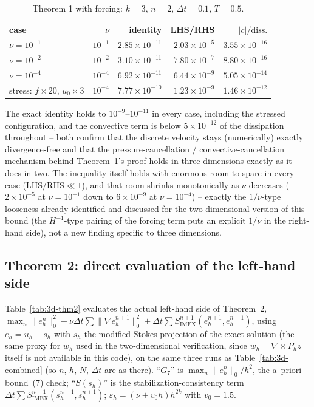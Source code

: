 \documentclass[11pt]{article}
\newcommand{\eps}{\varepsilon}
\begin{document}
\begin{table}[h]\centering
\caption{Theorem 1 with forcing: $k=3$, $n=2$, $\Delta t=0.1$, $T=0.5$.}
\label{tab:3d-thm1}
\begin{tabular}{lrrrr}
\toprule
case & $\nu$ & identity & LHS/RHS & $|c|/\mathrm{diss.}$ \\
\midrule
$\nu=10^{-1}$                      & $10^{-1}$ & $2.85\times10^{-11}$ & $2.03\times10^{-5}$ & $3.55\times10^{-16}$ \\
$\nu=10^{-2}$                      & $10^{-2}$ & $3.10\times10^{-11}$ & $7.80\times10^{-7}$ & $8.80\times10^{-16}$ \\
$\nu=10^{-4}$                      & $10^{-4}$ & $6.92\times10^{-11}$ & $6.44\times10^{-9}$ & $5.05\times10^{-14}$ \\
stress: $f\times20$, $u_0\times3$  & $10^{-4}$ & $7.77\times10^{-10}$ & $1.23\times10^{-9}$ & $1.46\times10^{-12}$ \\
\bottomrule
\end{tabular}
\end{table}

The exact identity holds to $10^{-9}$--$10^{-11}$ in every case, including the stressed
configuration, and the convective term is below $5\times10^{-12}$ of the dissipation
throughout -- both confirm that the discrete velocity stays (numerically) exactly
divergence-free and that the pressure-cancellation / convective-cancellation mechanism
behind Theorem~1's proof holds in three dimensions exactly as it does in two. The
inequality itself holds with enormous room to spare in every case ($\mathrm{LHS/RHS}\ll1$),
and that room shrinks monotonically as $\nu$ decreases ($2\times10^{-5}$ at $\nu=10^{-1}$
down to $6\times10^{-9}$ at $\nu=10^{-4}$) -- exactly the $1/\nu$-type looseness already
identified and discussed for the two-dimensional version of this bound (the $H^{-1}$-type
pairing of the forcing term puts an explicit $1/\nu$ in the right-hand side), not a new
finding specific to three dimensions.

\subsection{Theorem 2: direct evaluation of the left-hand side}
\label{sec:3d-theorem2}

Table~\ref{tab:3d-thm2} evaluates the actual left-hand side of Theorem~2,
$\max_n\|e_h^n\|_0^2 + \nu\Delta t\sum\|\nabla e_h^{n+1}\|_0^2 + \Delta t\sum
S_{\mathrm{IMEX}}^{n+1}(e_h^{n+1},e_h^{n+1})$, using $e_h=u_h-s_h$ with $s_h$ the modified
Stokes projection of the exact solution (the same proxy for $w_h$ used in the
two-dimensional verification, since $w_h=\nabla\times P_h z$ itself is not available in
this code), on the same three runs as Table~\ref{tab:3d-combined} (so $n$, $h$, $N$,
$\Delta t$ are as there). ``$G_7$'' is $\max_n\|e_h^n\|_0/h^2$, the a~priori bound~(7)
check; ``$S(s_h)$'' is the stabilization-consistency term $\Delta t\sum
S_{\mathrm{IMEX}}^{n+1}(s_h^{n+1},s_h^{n+1})$; $\eps_h=(\nu+v_0h)h^{2k}$ with $v_0=1.5$.
\end{document}
